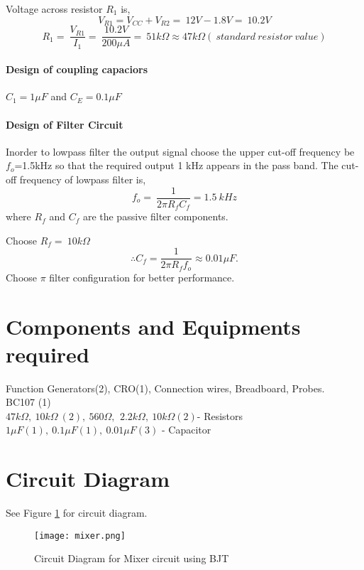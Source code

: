 \noindent Voltage across resistor $R_1$ is,
\begin{equation}
V_{R1}= V_{CC} +V_{R2} =\ 12V-1.8V=\ 10.2 V
\end{equation}
 \begin{equation}
R_1=\ \frac{V_{R1}}{I_1}= \ \frac{10.2V}{200 \mu A}=\ 51k\Omega \approx 47 k\Omega (\ standard \ resistor \ value)
\end{equation}

\paragraph{Design of coupling capaciors\\}
\noindent $C_1 = 1 \mu F$ and $C_E = 0.1 \mu F $

\paragraph{Design of Filter Circuit\\}

\noindent Inorder to lowpass filter the output signal choose the upper cut-off frequency be $f_o$=1.5kHz so that the required output 1 kHz appears in the pass band.
\noindent The cut-off frequency of lowpass filter is,
\begin{equation}
f_o=\ \frac{1}{2\pi R_fC_f}=1.5\ kHz
\end{equation}
\noindent where $R_f$ and $C_f$ are the passive filter components.

Choose $R_f=\ 10k\Omega$
\begin{equation}
\therefore C_f=\frac{1}{2\pi R_f f_o} \approx 0.01 \mu F.
\end{equation}
\noindent Choose $\pi$ filter configuration for better performance.
\section*{Components and Equipments required}
Function Generators(2), CRO(1), Connection wires, Breadboard, Probes.
\\BC107 (1)
\\ $47k\Omega,\  10k\Omega\ (2),\ 560\Omega,\,\ 2.2k\Omega ,\ 10k\Omega (2) $- Resistors
\\ $ 1\mu F (1),\ 0.1\mu F (1), \ 0.01\mu F (3)$ - Capacitor
\section*{Circuit Diagram}
See Figure \ref{mixer} for circuit diagram.
\begin{figure}[h]
\texttt{[image: mixer.png]}
\caption{Circuit Diagram for Mixer circuit using BJT}
\label{mixer}
\end{figure}
